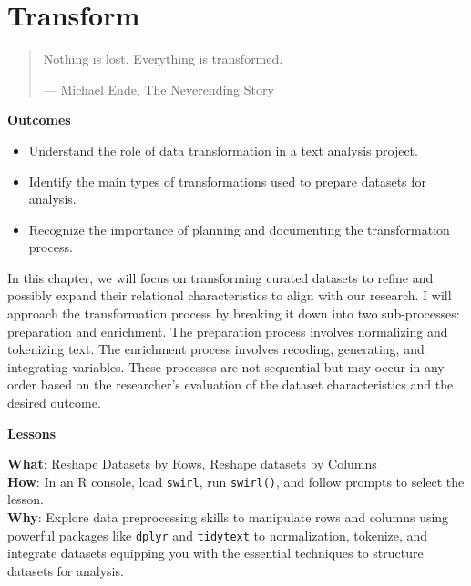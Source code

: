 \documentclass[
  letterpaper,
]{latex/krantz}
\providecommand{\tightlist}{%
  \setlength{\itemsep}{0pt}\setlength{\parskip}{0pt}}\usepackage{longtable,booktabs,array}
\theoremstyle{definition}
\theoremstyle{remark}
\begin{document}
\chapter{Transform}\label{sec-transform-chapter}

\begin{quote}
Nothing is lost. Everything is transformed.

--- Michael Ende, The Neverending Story
\end{quote}

\begin{tcolorbox}[enhanced jigsaw, breakable, leftrule=.75mm, arc=.35mm, colframe=quarto-callout-color-frame, colback=white, left=2mm, bottomrule=.15mm, rightrule=.15mm, toprule=.15mm, opacityback=0]

\textbf{ Outcomes}

\begin{itemize}
\tightlist
\item
  Understand the role of data transformation in a text analysis project.
\item
  Identify the main types of transformations used to prepare datasets
  for analysis.
\item
  Recognize the importance of planning and documenting the
  transformation process.
\end{itemize}

\end{tcolorbox}

In this chapter, we will focus on transforming curated datasets to
refine and possibly expand their relational characteristics to align
with our research. I will approach the transformation process by
breaking it down into two sub-processes: preparation and enrichment. The
preparation process involves normalizing and tokenizing text. The
enrichment process involves recoding, generating, and integrating
variables. These processes are not sequential but may occur in any order
based on the researcher's evaluation of the dataset characteristics and
the desired outcome.

\begin{tcolorbox}[enhanced jigsaw, breakable, leftrule=.75mm, arc=.35mm, colframe=quarto-callout-color-frame, colback=white, left=2mm, bottomrule=.15mm, rightrule=.15mm, toprule=.15mm, opacityback=0]

\textbf{ Lessons}

\textbf{What}: Reshape Datasets by Rows, Reshape datasets by Columns\\
\textbf{How}: In an R console, load \texttt{swirl}, run
\texttt{swirl()}, and follow prompts to select the lesson.\\
\textbf{Why}: Explore data preprocessing skills to manipulate rows and
columns using powerful packages like \texttt{dplyr} and
\texttt{tidytext} to normalization, tokenize, and integrate datasets
equipping you with the essential techniques to structure datasets for
analysis.

\end{tcolorbox}
\end{document}
